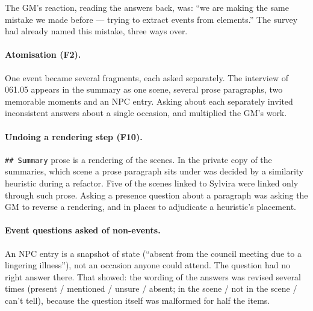 \documentclass[11pt]{article}
\newcommand{\code}[1]{\texttt{#1}}
\begin{document}
The GM's reaction, reading the answers back, was: ``we are making the same mistake we
made before --- trying to extract events from elements.'' The survey had already named
this mistake, three ways over.

\paragraph{Atomisation (F2).}
One event became several fragments, each asked separately. The interview of 061.05
appears in the summary as one scene, several prose paragraphs, two memorable moments
and an NPC entry. Asking about each separately invited inconsistent answers about a
single occasion, and multiplied the GM's work.

\paragraph{Undoing a rendering step (F10).}
\code{\#\# Summary} prose is a rendering of the scenes. In the private copy of the
summaries, which scene a prose paragraph sits under was decided by a similarity
heuristic during a refactor. Five of the scenes linked to Sylvira were linked only
through such prose. Asking a presence question about a paragraph was asking the GM to
reverse a rendering, and in places to adjudicate a heuristic's placement.

\paragraph{Event questions asked of non-events.}
An NPC entry is a snapshot of state (``absent from the council meeting due to a
lingering illness''), not an occasion anyone could attend. The question had no right
answer there. That showed: the wording of the answers was revised several times
(present / mentioned / unsure / absent; in the scene / not in the scene / can't tell),
because the question itself was malformed for half the items.
\end{document}
